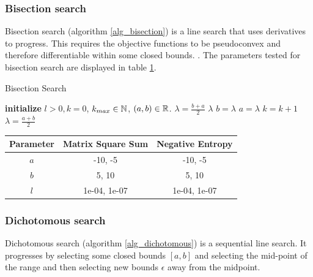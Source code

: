 \documentclass[english, 12pt, a4paper, sci, utf8, a-1b, online, table]{aaltothesis}
\newcommand{\abs}[1]{\ensuremath|#1|}
\newcommand{\R}{\ensuremath\mathbb{R}}
\newcommand{\N}{\ensuremath\mathbb{N}}
\begin{document}
\subsubsection{Bisection search}


Bisection search (algorithm \ref{alg_bisection}) is a line search that uses derivatives to progress. This requires the objective functions to be pseudoconvex and therefore differentiable within some closed bounds. \cite{book:nonlinear_programming}. The parameters tested for bisection search are displayed in table \ref{tab:params_BisectionSearch}.

\begin{algorithm}[H]
\caption{Bisection Search}
\label{alg_bisection}
\begin{algorithmic}[1]
\STATE \textbf{initialize} $l > 0, k = 0$, $k_{max} \in \N$, $(a, b) \in \R$.
\WHILE{$\abs{b - a} > l$ \AND $k < k_{max}$}
    \STATE $\lambda = \frac{b + a}{2}$
        \RETURN $\lambda$
        \STATE $b = \lambda$
    \ELSE
        \STATE $a = \lambda$
    \ENDIF
    \STATE $k = k + 1$
\ENDWHILE
\RETURN $\lambda = \frac{a + b}{2}$
\end{algorithmic}
\end{algorithm}

\begin{table}[H]
\label{tab:params_BisectionSearch}
\centering
{}
\begin{tabular}{|c|c|c|}
\hline
\rowcolor{gray!25}
Parameter & Matrix Square Sum & Negative Entropy \\
\hline
$a$ & -10, -5 & -10, -5 \\
$b$ & 5, 10 & 5, 10 \\
$l$ & 1e-04, 1e-07 & 1e-04, 1e-07 \\
\hline
\end{tabular}
\end{table}


\subsubsection{Dichotomous search}


Dichotomous search (algorithm \ref{alg_dichotomous}) is a sequential line search. It progresses by selecting some closed bounds $[a, b]$ and selecting the mid-point of the range and then selecting new bounds $\epsilon$ away from the midpoint. \cite{book:nonlinear_programming}
\end{document}
